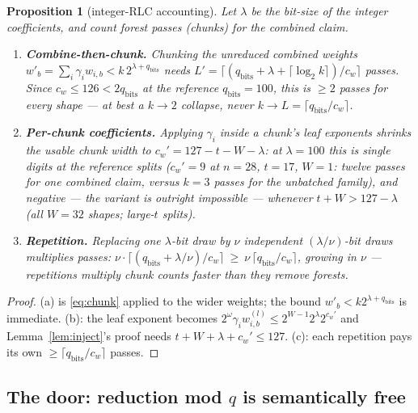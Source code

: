 \documentclass[11pt]{article}
\newcommand{\cw}{c_w}
\theoremstyle{plain}
\newtheorem{proposition}[theorem]{Proposition}
\theoremstyle{definition}
\theoremstyle{remark}
\begin{document}
\begin{proposition}[integer-RLC accounting]\label{prop:intrlc}
Let $\lambda$ be the bit-size of the integer coefficients, and count forest
passes (chunks) for the combined claim.
\begin{enumerate}[label=\textup{(\alph*)},leftmargin=2.2em,itemsep=2pt]
\item \textbf{Combine-then-chunk.} Chunking the unreduced combined weights
  $w'_b=\sum_i\gamma_i w_{i,b} < k\,2^{\lambda+q_{\mathrm{bits}}}$ needs
  $L' = \bigl\lceil (q_{\mathrm{bits}}+\lambda+\lceil\log_2 k\rceil)/\cw \bigr\rceil$
  passes. Since $\cw\le 126 < 2q_{\mathrm{bits}}$ at the reference
  $q_{\mathrm{bits}}=100$, this is $\ge 2$ passes for every shape --- at best
  a $k\to 2$ collapse, never $k\to L=\lceil q_{\mathrm{bits}}/\cw\rceil$.
\item \textbf{Per-chunk coefficients.} Applying $\gamma_i$ inside a chunk's
  leaf exponents shrinks the usable chunk width to
  $\cw' = 127-t-W-\lambda$: at $\lambda=100$ this is single digits at the
  reference splits ($\cw'=9$ at $n=28$, $t=17$, $W=1$: \emph{twelve} passes
  for one combined claim, versus $k=3$ passes for the unbatched family), and
  \emph{negative} --- the variant is outright impossible --- whenever
  $t+W>127-\lambda$ (all $W=32$ shapes; large-$t$ splits).
\item \textbf{Repetition.} Replacing one $\lambda$-bit draw by $\nu$
  independent $(\lambda/\nu)$-bit draws multiplies passes:
  $\nu\cdot\lceil (q_{\mathrm{bits}}+\lambda/\nu)/\cw\rceil \ \ge\
  \nu\,\lceil q_{\mathrm{bits}}/\cw\rceil$, growing in $\nu$ --- repetitions
  multiply chunk counts faster than they remove forests.
\end{enumerate}
\end{proposition}

\begin{proof}
(a) is \eqref{eq:chunk} applied to the wider weights; the bound
$w'_b<k2^{\lambda+q_{\mathrm{bits}}}$ is immediate. (b): the leaf exponent
becomes $2^{\omega}\gamma_i w^{(l)}_{i,b}\le
2^{W-1}2^{\lambda}2^{\cw'}$ and Lemma~\ref{lem:inject}'s proof needs
$t+W+\lambda+\cw'\le 127$. (c): each repetition pays its own
$\ge\lceil q_{\mathrm{bits}}/\cw\rceil$ passes.
\end{proof}

\subsection{The door: reduction mod \texorpdfstring{$q$}{q} is semantically free}\label{sec:door}
\end{document}
